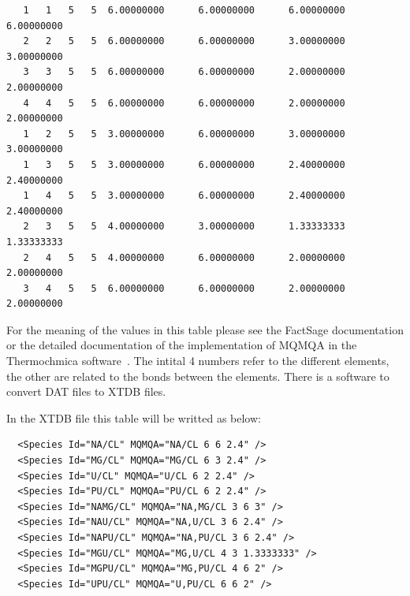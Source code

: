 \documentclass{article}
\begin{document}
\begin{framed}
\begin{minipage}[t]{\textwidth}
\noindent
\vspace{-2mm}
{\small
\begin{verbatim}
   1   1   5   5  6.00000000      6.00000000      6.00000000      6.00000000
   2   2   5   5  6.00000000      6.00000000      3.00000000      3.00000000
   3   3   5   5  6.00000000      6.00000000      2.00000000      2.00000000
   4   4   5   5  6.00000000      6.00000000      2.00000000      2.00000000
   1   2   5   5  3.00000000      6.00000000      3.00000000      3.00000000
   1   3   5   5  3.00000000      6.00000000      2.40000000      2.40000000
   1   4   5   5  3.00000000      6.00000000      2.40000000      2.40000000
   2   3   5   5  4.00000000      3.00000000      1.33333333      1.33333333
   2   4   5   5  4.00000000      6.00000000      2.00000000      2.00000000
   3   4   5   5  6.00000000      6.00000000      2.00000000      2.00000000
\end{verbatim}
}
\end{minipage}
\end{framed}

For the meaning of the values in this table please see the FactSage
documentation or the detailed documentation of the implementation of
MQMQA in the Thermochmica software~\cite{21Posch}.  The intital 4
numbers refer to the different elements, the other are related to the
bonds between the elements.  There is a software to convert DAT files
to XTDB files.

In the XTDB file this table will be writted as below:

\begin{framed}
\begin{minipage}[t]{\textwidth}
\vspace{-2mm}
\noindent
{\small
\begin{verbatim}
  <Species Id="NA/CL" MQMQA="NA/CL 6 6 2.4" />
  <Species Id="MG/CL" MQMQA="MG/CL 6 3 2.4" />
  <Species Id="U/CL" MQMQA="U/CL 6 2 2.4" />
  <Species Id="PU/CL" MQMQA="PU/CL 6 2 2.4" />
  <Species Id="NAMG/CL" MQMQA="NA,MG/CL 3 6 3" />
  <Species Id="NAU/CL" MQMQA="NA,U/CL 3 6 2.4" />
  <Species Id="NAPU/CL" MQMQA="NA,PU/CL 3 6 2.4" />
  <Species Id="MGU/CL" MQMQA="MG,U/CL 4 3 1.3333333" />
  <Species Id="MGPU/CL" MQMQA="MG,PU/CL 4 6 2" />
  <Species Id="UPU/CL" MQMQA="U,PU/CL 6 6 2" />
\end{verbatim}
}
\end{minipage}
\end{framed}
\end{document}
